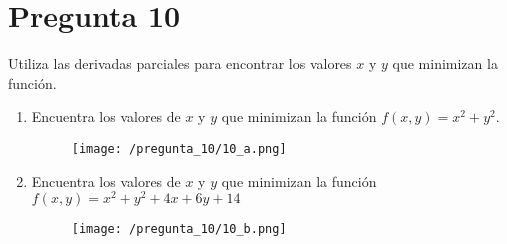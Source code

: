 \documentclass[]{article}
\begin{document}
\section*{Pregunta 10}
Utiliza las derivadas parciales para encontrar los valores $x$ y $y$ que minimizan la función.

\begin{enumerate}[label=(\alph*)]
	\item Encuentra los valores de $x$ y $y$ que minimizan la función $f(x,y)=x^2+y^2$.
	\begin{figure}[H]
		\texttt{[image: /pregunta\_10/10\_a.png]}
	\end{figure}
	\item Encuentra los valores de $x$ y $y$ que minimizan la función $f(x,y)=x^2+y^2+4x+6y+14$
	\begin{figure}[H]
		\texttt{[image: /pregunta\_10/10\_b.png]}
	\end{figure}
\end{enumerate}
\end{document}

